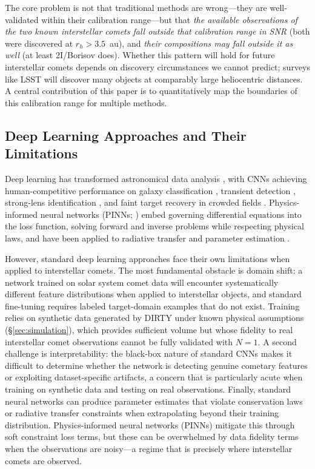 \documentclass[usenatbib]{mnras}
\begin{document}
The core problem is not that traditional methods are wrong---they are well-validated within their calibration range---but that \textit{the available observations of the two known interstellar comets fall outside that calibration range in SNR} (both were discovered at $r_h > 3.5$~au), and \textit{their compositions may fall outside it as well} (at least 2I/Borisov does). Whether this pattern will hold for future interstellar comets depends on discovery circumstances we cannot predict; surveys like LSST will discover many objects at comparably large heliocentric distances. A central contribution of this paper is to quantitatively map the boundaries of this calibration range for multiple methods.

\subsection{Deep Learning Approaches and Their Limitations}

Deep learning has transformed astronomical data analysis \citep{baron19}, with CNNs achieving human-competitive performance on galaxy classification \citep{dieleman15}, transient detection \citep{goldstein15}, strong-lens identification \citep{lanusse18}, and faint target recovery in crowded fields \citep{jiang23}. Physics-informed neural networks (PINNs; \citealt{raissi19}) embed governing differential equations into the loss function, solving forward and inverse problems while respecting physical laws, and have been applied to radiative transfer \citep{mishra21,biswal25} and parameter estimation \citep{lu21}.

However, standard deep learning approaches face their own limitations when applied to interstellar comets. The most fundamental obstacle is domain shift: a network trained on solar system comet data will encounter systematically different feature distributions when applied to interstellar objects, and standard fine-tuning requires labeled target-domain examples that do not exist. Training relies on synthetic data generated by DIRTY under known physical assumptions (\S\ref{sec:simulation}), which provides sufficient volume but whose fidelity to real interstellar comet observations cannot be fully validated with $N=1$. A second challenge is interpretability: the black-box nature of standard CNNs makes it difficult to determine whether the network is detecting genuine cometary features or exploiting dataset-specific artifacts, a concern that is particularly acute when training on synthetic data and testing on real observations. Finally, standard neural networks can produce parameter estimates that violate conservation laws or radiative transfer constraints when extrapolating beyond their training distribution. Physics-informed neural networks (PINNs) mitigate this through soft constraint loss terms, but these can be overwhelmed by data fidelity terms when the observations are noisy---a regime that is precisely where interstellar comets are observed.
\end{document}
